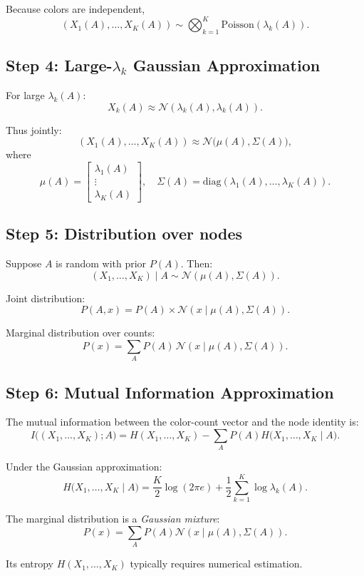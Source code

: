 \documentclass[11pt]{article}
\begin{document}
Because colors are independent,
\[
(X_1(A), \ldots, X_K(A)) \sim \bigotimes_{k=1}^K \mathrm{Poisson}(\lambda_k(A)).
\]

\subsection*{Step 4: Large-$\lambda_k$ Gaussian Approximation}

For large $\lambda_k(A)$:
\[
X_k(A) \approx \mathcal{N}(\lambda_k(A), \lambda_k(A)).
\]

Thus jointly:
\[
(X_1(A), \ldots, X_K(A)) \approx \mathcal{N}\bigl(\mu(A), \Sigma(A)\bigr),
\]
where
\[
\mu(A) = \begin{bmatrix}\lambda_1(A) \\ \vdots \\ \lambda_K(A)\end{bmatrix}, \quad
\Sigma(A) = \mathrm{diag}(\lambda_1(A), \ldots, \lambda_K(A)).
\]

\subsection*{Step 5: Distribution over nodes}

Suppose $A$ is random with prior $P(A)$. Then:
\[
(X_1,\ldots,X_K) \mid A \sim \mathcal{N}(\mu(A), \Sigma(A)).
\]

Joint distribution:
\[
P(A, x) = P(A) \times \mathcal{N}(x \mid \mu(A), \Sigma(A)).
\]

Marginal distribution over counts:
\[
P(x) = \sum_A P(A) \, \mathcal{N}(x \mid \mu(A), \Sigma(A)).
\]

\subsection*{Step 6: Mutual Information Approximation}

The mutual information between the color-count vector and the node identity is:
\[
I\bigl((X_1,\ldots,X_K); A\bigr) = H(X_1,\ldots,X_K) - \sum_A P(A) H\bigl(X_1,\ldots,X_K \mid A\bigr).
\]

Under the Gaussian approximation:
\[
H\bigl(X_1,\ldots,X_K \mid A\bigr) = \frac{K}{2}\log(2\pi e) + \frac{1}{2}\sum_{k=1}^K \log \lambda_k(A).
\]

The marginal distribution is a \emph{Gaussian mixture}:
\[
P(x) = \sum_A P(A) \mathcal{N}(x \mid \mu(A), \Sigma(A)).
\]

Its entropy $H(X_1,\ldots,X_K)$ typically requires numerical estimation.
\end{document}
